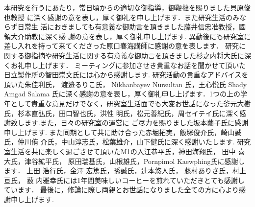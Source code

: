 \begin{shaji}
  \addcontentsline{}{}{}
 本研究を行うにあたり，常日頃からの適切な御指導，御鞭撻を賜りました貝原俊也教授
 に深く感謝の意を表し，厚く御礼を申し上げます．また研究生活のみならず日常生
 活におきましても有意義な御助言を頂きました藤井信忠准教授，國領大介助教に深く感
 謝の意を表し，厚く御礼申し上げます.
 異動後にも研究室に差し入れを持って来てくださった原口春海講師に感謝の意を表します．
 研究に関する御指摘や研究生活に関する有意義な御助言を頂きました杉之内将大氏に深くお礼申し上げます．
 ミーティングに参加させき貴重なお話を聞かせて頂いた日立製作所の智田崇文氏には心から感謝します.
研究活動の貴重なアドバイスを頂いた朱佳利氏， 渡邉るりこ氏， Nikhanbayev Nursultan 氏，王心悦氏 Shady Amgad Salama
氏に深く感謝の意を表し，厚く御礼申し上げます．1つの上の学年として貴重な意見だけでなく，研究室生活面でも大変お世話になった釜元大樹氏，杉本直弘氏，田口智也氏，洪性 明氏，松元善紀氏，周セイテイ氏に深く感謝致します.また，日々の研究室の運営に ご尽力を賜りました坂本繭子氏に感謝申し上げます.
また同期として共に助け合った赤堀拓実，飯塚俊介氏，崎山誠氏，仲川侑 介氏，中山淳志氏，松葉雄介，山下健氏に深く感謝いたします.
研究室生活を共に楽しく過ごさせて頂いたM1の入江恭平氏，神田海翔氏， 田中 喜大氏，津谷絋平氏， 原田瑞基氏，山根雄氏，Pornpimol Kaewphing氏に感謝します．
上田 浩行氏，金澤 宏篤氏，孫誠氏，辻本悠人氏， 藤村ありさ氏，村上亘氏， 薮
内雅幸氏には1年間美味しいコーヒーを煎れていただきとても感謝しています．
最後に，修論に際し両親とお世話になりました全ての方に心より感謝申し上げます. 
\end{shaji}


